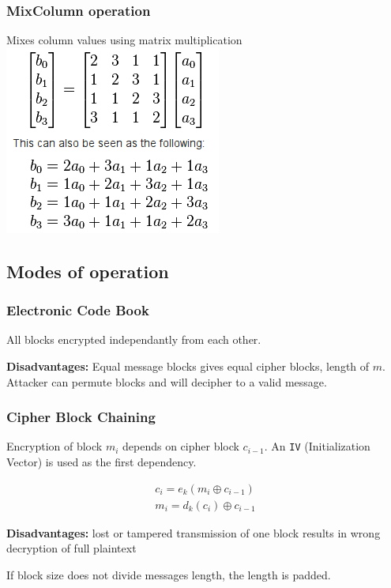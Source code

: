 \subsubsection{MixColumn operation}
Mixes column values using matrix multiplication
\includegraphics[scale=0.6]{images/4-mixcol}

\subsection{Modes of operation}

\subsubsection*{Electronic Code Book}

All blocks encrypted independantly from each other.

\textbf{Disadvantages:} Equal message blocks gives equal cipher
blocks, length of $m$. Attacker can permute blocks and will decipher
to a valid message.

\subsubsection*{Cipher Block Chaining}

Encryption of block $m_i$ depends on cipher block $c_{i-1}$. An
\texttt{IV} (Initialization Vector) is used as the first dependency.

\begin{align*}
  c_i = e_k(m_i \oplus c_{i - 1})\\
  m_i = d_k(c_i) \oplus c_{i-1}
\end{align*}

\textbf{Disadvantages:} lost or tampered transmission of one block
results in wrong decryption of full plaintext

If block size does not divide messages length, the length is padded.

